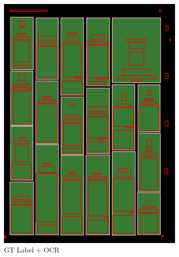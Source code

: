 \documentclass[aspectratio=1610]{beamer}
\begin{document}
\begin{frame}
\begin{figure}
\begin{subfigure}{.25\textwidth}
  \includegraphics[width=0.99\linewidth, clip=true, trim = 0mm 0mm 0mm 0mm]{figures/ocr_bbox/GQU6vjW.jpg}
  \caption{GT Label + OCR}
\end{subfigure}%
\begin{subfigure}{.25\textwidth}
  \centering

\end{subfigure}
\end{figure}
\end{frame}
\end{document}
